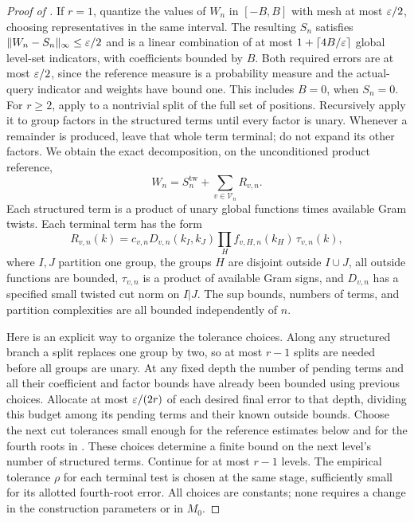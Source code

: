 \begin{proof}[Proof of ]
If $r=1$, quantize the values of $W_n$ in $[-B,B]$ with mesh at most
$\varepsilon/2$, choosing representatives in the same interval. The resulting
$S_n$ satisfies $\lVert W_n-S_n\rVert_\infty\le\varepsilon/2$ and is a linear
combination of at most $1+\lceil4B/\varepsilon\rceil$ global level-set
indicators, with coefficients bounded by $B$. Both required errors
are at most $\varepsilon/2$, since the reference measure is a probability
measure and the actual-query indicator and weights have bound one.
This includes $B=0$, when $S_n=0$. For $r\ge2$,
apply  to a nontrivial split of
the full set of positions. Recursively apply it to group factors in
the structured terms until every factor is unary. Whenever a
remainder is produced, leave that whole term terminal; do not expand
its other factors. We obtain the exact decomposition, on the
unconditioned product reference,
\begin{equation}\label{eq:product-recursive-decomposition}
 W_n=S_n^{\mathrm{tw}}+\sum_{v\in\mathcal V_n}R_{v,n}.
\end{equation}
Each structured term is a product of unary global functions times
available Gram twists. Each terminal term has the form
\begin{equation}\label{eq:product-terminal-form}
 R_{v,n}(k)=c_{v,n}D_{v,n}(k_I,k_J)
       \prod_{H}f_{v,H,n}(k_H)\,\tau_{v,n}(k),
\end{equation}
where $I,J$ partition one group, the groups $H$ are disjoint outside
$I\cup J$, all outside functions are bounded, $\tau_{v,n}$ is a
product of available Gram signs, and $D_{v,n}$ has a specified small
twisted cut norm on $I|J$. The sup bounds, numbers of terms, and
partition complexities are all bounded independently of $n$.

Here is an explicit way to organize the tolerance choices. Along
any structured branch a split replaces one group by two, so at most
$r-1$ splits are needed before all groups are unary. At any fixed
depth the number of pending terms and all their coefficient and
factor bounds have already been bounded using previous choices.
Allocate at most $\varepsilon/(2r)$ of each desired final error to that
depth, dividing this budget among its pending terms and their known
outside bounds. Choose the next cut tolerances small enough for the
reference estimates below and for the fourth roots in
. These choices determine a
finite bound on the next level's number of structured terms.
Continue for at most $r-1$ levels. The empirical tolerance $\rho$ for
each terminal test is chosen at the same stage, sufficiently small
for its allotted fourth-root error. All choices are constants; none
requires a change in the construction parameters or in $M_0$.


\end{proof}
